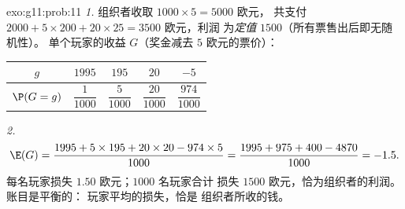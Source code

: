 \begin{solution}{exo:g11:prob:11}
\emph{1.} 组织者收取 $1000 \times 5 = 5000$ 欧元，
共支付 $2000 + 5 \times 200 + 20 \times 25 = 3500$ 欧元，利润
为\emph{定值} $1500$（所有票售出后即无随机性）。
单个玩家的收益 $G$（奖金减去 $5$ 欧元的票价）：
\begin{center}
\begin{tabular}{c|cccc}
$g$ & $1995$ & $195$ & $20$ & $-5$\\
\hline\rule{0pt}{11pt}%
$\P(G=g)$ & $\dfrac{1}{1000}$ & $\dfrac{5}{1000}$ & $\dfrac{20}{1000}$
& $\dfrac{974}{1000}$
\end{tabular}
\end{center}

\emph{2.}
\[
\E(G) = \frac{1995 + 5 \times 195 + 20 \times 20 - 974 \times 5}{1000}
= \frac{1995 + 975 + 400 - 4870}{1000} = -1.5 .
\]
每名玩家损失 $1.50$ 欧元；$1000$ 名玩家合计
损失 $1500$ 欧元，恰为组织者的利润。账目是平衡的：
玩家平均的损失，恰是
组织者所收的钱。
\end{solution}

